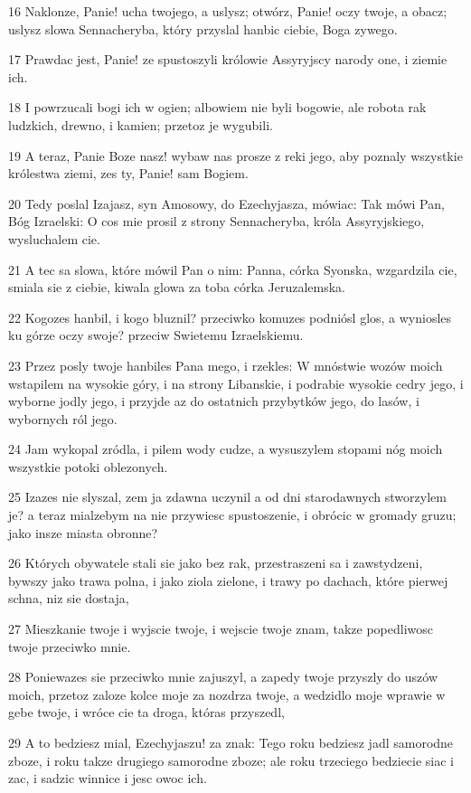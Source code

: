 \par 16 Naklonze, Panie! ucha twojego, a uslysz; otwórz, Panie! oczy twoje, a obacz; uslysz slowa Sennacheryba, który przyslal hanbic ciebie, Boga zywego.
\par 17 Prawdac jest, Panie! ze spustoszyli królowie Assyryjscy narody one, i ziemie ich.
\par 18 I powrzucali bogi ich w ogien; albowiem nie byli bogowie, ale robota rak ludzkich, drewno, i kamien; przetoz je wygubili.
\par 19 A teraz, Panie Boze nasz! wybaw nas prosze z reki jego, aby poznaly wszystkie królestwa ziemi, zes ty, Panie! sam Bogiem.
\par 20 Tedy poslal Izajasz, syn Amosowy, do Ezechyjasza, mówiac: Tak mówi Pan, Bóg Izraelski: O cos mie prosil z strony Sennacheryba, króla Assyryjskiego, wysluchalem cie.
\par 21 A tec sa slowa, które mówil Pan o nim: Panna, córka Syonska, wzgardzila cie, smiala sie z ciebie, kiwala glowa za toba córka Jeruzalemska.
\par 22 Kogozes hanbil, i kogo bluznil? przeciwko komuzes podniósl glos, a wyniosles ku górze oczy swoje? przeciw Swietemu Izraelskiemu.
\par 23 Przez posly twoje hanbiles Pana mego, i rzekles: W mnóstwie wozów moich wstapilem na wysokie góry, i na strony Libanskie, i podrabie wysokie cedry jego, i wyborne jodly jego, i przyjde az do ostatnich przybytków jego, do lasów, i wybornych ról jego.
\par 24 Jam wykopal zródla, i pilem wody cudze, a wysuszylem stopami nóg moich wszystkie potoki oblezonych.
\par 25 Izazes nie slyszal, zem ja zdawna uczynil a od dni starodawnych stworzylem je? a teraz mialzebym na nie przywiesc spustoszenie, i obrócic w gromady gruzu; jako insze miasta obronne?
\par 26 Których obywatele stali sie jako bez rak, przestraszeni sa i zawstydzeni, bywszy jako trawa polna, i jako ziola zielone, i trawy po dachach, które pierwej schna, niz sie dostaja,
\par 27 Mieszkanie twoje i wyjscie twoje, i wejscie twoje znam, takze popedliwosc twoje przeciwko mnie.
\par 28 Poniewazes sie przeciwko mnie zajuszyl, a zapedy twoje przyszly do uszów moich, przetoz zaloze kolce moje za nozdrza twoje, a wedzidlo moje wprawie w gebe twoje, i wróce cie ta droga, któras przyszedl,
\par 29 A to bedziesz mial, Ezechyjaszu! za znak: Tego roku bedziesz jadl samorodne zboze, i roku takze drugiego samorodne zboze; ale roku trzeciego bedziecie siac i zac, i sadzic winnice i jesc owoc ich.
